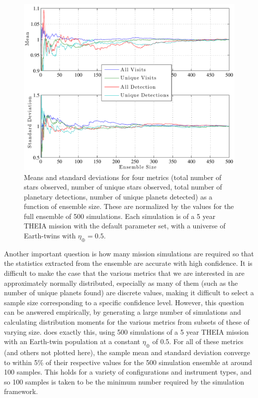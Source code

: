 \begin{figure}[ht]
\centering
\includegraphics[width = 6in]{./figures/burnin}
 \caption[Science yield metric statistics as a function of ensemble size]{ \label{fig:burnin} Means and standard deviations for four metrics (total number of stars observed, number of unique stars observed, total number of planetary detections, number of unique planets detected) as a function of ensemble size.  These are normalized by the values for the full ensemble of 500 simulations.  Each simulation is of a 5 year THEIA mission with the default parameter set, with a universe of Earth-twins with $\eta_\oplus = 0.5$.}
 \end{figure}
Another important question is how many mission simulations are required so that the statistics extracted from the ensemble are accurate with high confidence.  It is difficult to make the case that the various metrics that we are interested in are approximately normally distributed, especially as many of them (such as the number of unique planets found) are discrete values, making it difficult to select a sample size corresponding to a specific confidence level.  However, this question can be answered empirically, by generating a large number of simulations and calculating distribution moments for the various metrics from subsets of these of varying size.   does exactly this, using 500 simulations of a 5 year THEIA mission with an Earth-twin population at a constant $\eta_\oplus$ of 0.5.  For all of these metrics (and others not plotted here), the sample mean and standard deviation converge to within 5\% of their respective values for the 500 simulation ensemble at around 100 samples.  This holds for a variety of configurations and instrument types, and so 100 samples is taken to be the minimum number required by the simulation framework.

